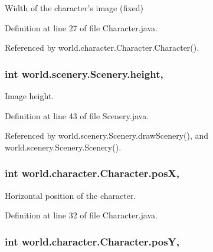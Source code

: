 Width of the character's image (fixed) 



Definition at line 27 of file Character.\-java.



Referenced by world.\-character.\-Character.\-Character().

\hypertarget{classworld_1_1scenery_1_1_scenery_a54b4edfa060087e78a829105bf62a900}{
\subsubsection[{height}]{\setlength{\rightskip}{0pt plus 5cm}int world.\-scenery.\-Scenery.\-height\hspace{0.3cm}{\ttfamily [protected]}, {\ttfamily [inherited]}}}\label{classworld_1_1scenery_1_1_scenery_a54b4edfa060087e78a829105bf62a900}


Image height. 



Definition at line 43 of file Scenery.\-java.



Referenced by world.\-scenery.\-Scenery.\-draw\-Scenery(), and world.\-scenery.\-Scenery.\-Scenery().

\hypertarget{classworld_1_1character_1_1_character_a78ad3a5c111a39df2ba12b542fa175b4}{
\subsubsection[{pos\-X}]{\setlength{\rightskip}{0pt plus 5cm}int world.\-character.\-Character.\-pos\-X\hspace{0.3cm}{\ttfamily [protected]}, {\ttfamily [inherited]}}}\label{classworld_1_1character_1_1_character_a78ad3a5c111a39df2ba12b542fa175b4}


Horizontal position of the character. 



Definition at line 32 of file Character.\-java.

\hypertarget{classworld_1_1character_1_1_character_a1e81a73a02b73e6f1608ba3c1b6d83ef}{
\subsubsection[{pos\-Y}]{\setlength{\rightskip}{0pt plus 5cm}int world.\-character.\-Character.\-pos\-Y\hspace{0.3cm}{\ttfamily [protected]}, {\ttfamily [inherited]}}}\label{classworld_1_1character_1_1_character_a1e81a73a02b73e6f1608ba3c1b6d83ef}


